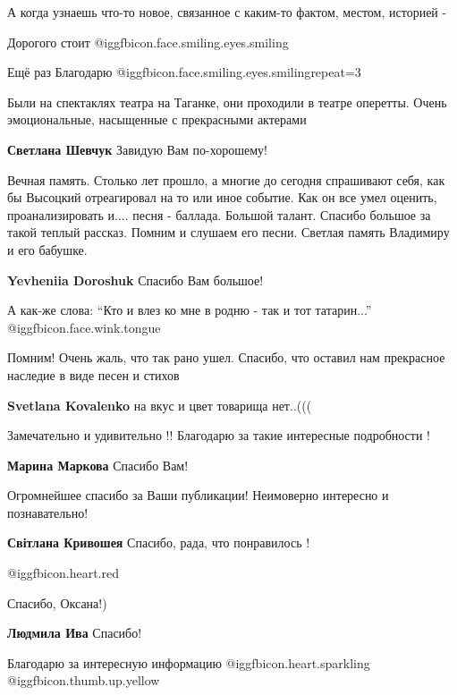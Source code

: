 \begin{itemize}
\begin{itemize}
А когда узнаешь что-то новое, связанное с каким-то фактом, местом, историей -

Дорогого стоит  @igg{fbicon.face.smiling.eyes.smiling} 

Ещё раз Благодарю  @igg{fbicon.face.smiling.eyes.smiling}{repeat=3} 
\end{itemize} %


Были на спектаклях театра на Таганке, они проходили в театре оперетты. Очень
эмоциональные, насыщенные с прекрасными актерами

\textbf{Светлана Шевчук} Завидую Вам по-хорошему!


Вечная память. Столько лет прошло, а многие до сегодня спрашивают себя, как бы
Высоцкий отреагировал на то или иное событие. Как он все умел оценить,
проанализировать и.... песня - баллада. Большой талант. Спасибо большое за такой
теплый рассказ. Помним и слушаем его песни. Светлая память Владимиру и его
бабушке.


\textbf{Yevheniia Doroshuk} Спасибо Вам большое!

А как-же слова: \enquote{Кто и влез ко мне в родню - так и тот татарин...}
@igg{fbicon.face.wink.tongue} 

Помним! Очень жаль, что так рано ушел. Спасибо, что оставил нам прекрасное наследие в виде песен и стихов

\textbf{Svetlana Kovalenko} на вкус и цвет товарища нет..(((

Замечательно и удивительно !! Благодарю за такие интересные подробности !

\textbf{Марина Маркова} Спасибо Вам!

Огромнейшее спасибо за Ваши публикации! Неимоверно интересно и познавательно!

\textbf{Світлана Кривошея} Спасибо, рада, что понравилось !

@igg{fbicon.heart.red}

Спасибо, Оксана!)

\textbf{Людмила Ива} Спасибо!

Благодарю за интересную информацию  @igg{fbicon.heart.sparkling}   @igg{fbicon.thumb.up.yellow} 


\end{itemize}
